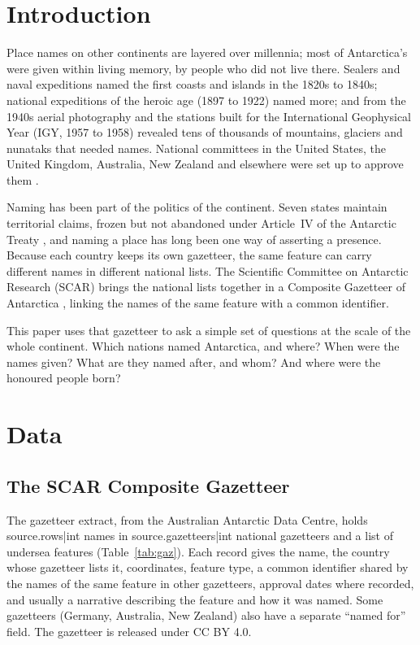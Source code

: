 \documentclass[11pt,a4paper]{article}
\begin{document}
\section{Introduction}
Place names on other continents are layered over millennia; most of Antarctica's were given within living memory, by people who did not live there. Sealers and naval expeditions named the first coasts and islands in the 1820s to 1840s; national expeditions of the heroic age (1897 to 1922) named more; and from the 1940s aerial photography and the stations built for the International Geophysical Year (IGY, 1957 to 1958) revealed tens of thousands of mountains, glaciers and nunataks that needed names. National committees in the United States, the United Kingdom, Australia, New Zealand and elsewhere were set up to approve them \citep{alberts,stewart}.

Naming has been part of the politics of the continent. Seven states maintain territorial claims, frozen but not abandoned under Article~IV of the Antarctic Treaty \citep{treaty}, and naming a place has long been one way of asserting a presence. Because each country keeps its own gazetteer, the same feature can carry different names in different national lists. The Scientific Committee on Antarctic Research (SCAR) brings the national lists together in a Composite Gazetteer of Antarctica \citep{scar}, linking the names of the same feature with a common identifier.

This paper uses that gazetteer to ask a simple set of questions at the scale of the whole continent. Which nations named Antarctica, and where? When were the names given? What are they named after, and whom? And where were the honoured people born?

\section{Data}
\subsection{The SCAR Composite Gazetteer}
The gazetteer extract, from the Australian Antarctic Data Centre, holds {{source.rows|int}} names in {{source.gazetteers|int}} national gazetteers and a list of undersea features (Table~\ref{tab:gaz}). Each record gives the name, the country whose gazetteer lists it, coordinates, feature type, a common identifier shared by the names of the same feature in other gazetteers, approval dates where recorded, and usually a narrative describing the feature and how it was named. Some gazetteers (Germany, Australia, New Zealand) also have a separate ``named for'' field. The gazetteer is released under CC BY 4.0.
\end{document}

